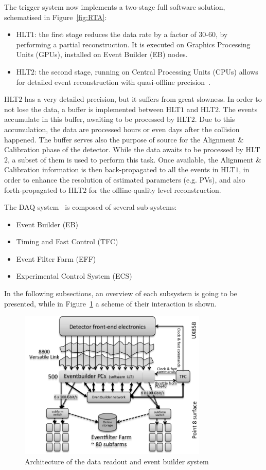 The trigger system now implements a two-stage full software solution, schematised in Figure~\ref{fig:RTA}:
\begin{itemize}
\item HLT$1$: the first stage reduces the data rate by a factor of 30-60, by performing a partial reconstruction. It is executed on Graphics Processing Units (GPUs), installed on Event Builder (EB) nodes.
\item HLT$2$: the second stage, running on Central Processing Units (CPUs) allows for detailed event reconstruction with quasi-offline precision~\cite{Gazzoni:2670650}.
\end{itemize}
HLT$2$ has a very detailed precision, but it suffers from great slowness. In order to not lose the data, a buffer is implemented between HLT$1$ and HLT$2$. The events accumulate in this buffer, awaiting to be processed by HLT$2$. Due to this accumulation, the data are processed hours or even days after the collision happened. 
The buffer serves also the purpose of source for the Alignment \& Calibration phase of the detector. While the data awaits to be processed by HLT$2$, a subset of them is used to perform this task. Once available, the Alignment \& Calibration information is then back-propagated to all the events in HLT$1$, in order to enhance the resolution of estimated parameters (e.g. PVs), and also forth-propagated to HLT$2$ for the offline-quality level reconstruction.

The DAQ system~\cite{CERN-LHCC-2014-016} is composed of several sub-systems:
\begin{itemize}
\item Event Builder (EB)
\item Timing and Fast Control (TFC)
\item Event Filter Farm (EFF)
\item Experimental Control System (ECS)
\end{itemize}
In the following subsections, an overview of each subsystem is going to be presented, while in Figure~\ref{fig:architecture_readout} a scheme of their interaction is shown.

\begin{figure}
    \centering
    \includegraphics[width=0.8\textwidth]{figures/The-architecture-of-Upgraded-LHCb-readout-system.png}
    \caption{Architecture of the data readout and event builder system}
    \label{fig:architecture_readout}
\end{figure}

